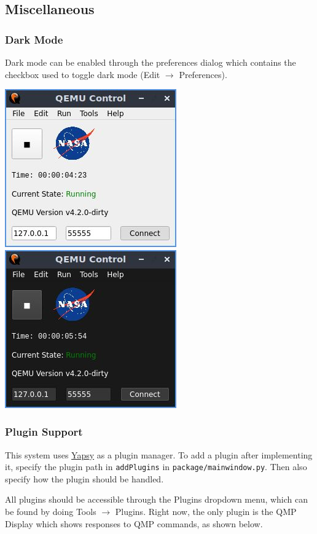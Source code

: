 \documentclass{article}
\newcommand{\code}[1]{\texttt{#1}}
\begin{document}
\subsection{Miscellaneous}
\subsubsection{Dark Mode}
Dark mode can be enabled through the preferences dialog which contains the checkbox used to toggle dark mode (Edit $\rightarrow$ Preferences).
\begin{center}
    \includegraphics[]{images/main_active.jpg}
    \includegraphics[]{images/main_active_dark.jpg}
\end{center}
\subsubsection{Plugin Support}
This system uses \href{https://yapsy.readthedocs.io/en/latest/}{Yapsy} as a plugin manager. To add a plugin after implementing it, specify the plugin path in \code{addPlugins} in \code{package/mainwindow.py}. Then also specify how the plugin should be handled.\par
All plugins should be accessible through the Plugins dropdown menu, which can be found by doing Tools $\rightarrow$ Plugins. Right now, the only plugin is the QMP Display which shows responses to QMP commands, as shown below.
\end{document}
